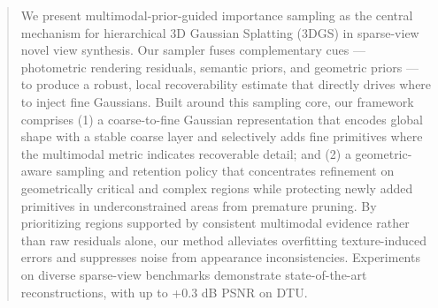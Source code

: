 \documentclass{article}
\begin{document}
\begin{abstract}
  
  
  We present multimodal-prior-guided importance sampling as the central mechanism for hierarchical 3D Gaussian Splatting (3DGS) in sparse-view novel view synthesis. Our sampler fuses complementary cues — photometric rendering residuals, semantic priors, and geometric priors — to produce a robust, local recoverability estimate that directly drives where to inject fine Gaussians. Built around this sampling core, our framework comprises (1) a coarse-to-fine Gaussian representation that encodes global shape with a stable coarse layer and selectively adds fine primitives where the multimodal metric indicates recoverable detail; and (2) a geometric-aware sampling and retention policy that concentrates refinement on geometrically critical and complex regions while protecting newly added primitives in underconstrained areas from premature pruning. By prioritizing regions supported by consistent multimodal evidence rather than raw residuals alone, our method alleviates overfitting texture-induced errors and suppresses noise from appearance inconsistencies. Experiments on diverse sparse-view benchmarks demonstrate state-of-the-art reconstructions, with up to +0.3 dB PSNR on DTU.
  
  \end{abstract}
  
\end{document}
